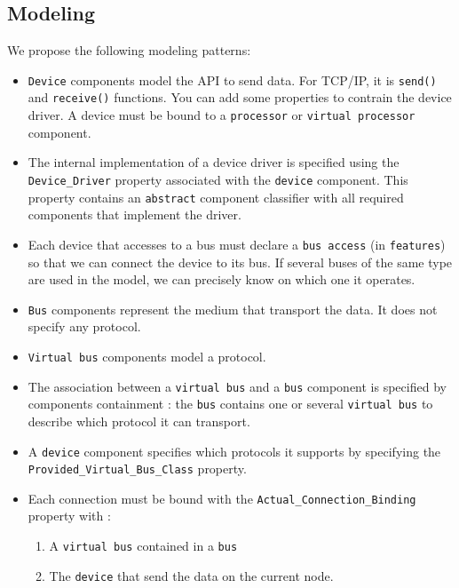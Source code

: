 \documentclass[11pt]{article}
\begin{document}
   \subsection{Modeling}
   We propose the following modeling patterns:
   \begin{itemize}
      \item
         \texttt{Device} components model the API to send data. For TCP/IP, it is
         \texttt{send()} and \texttt{receive()} functions. You can add some
         properties to contrain the device driver. A device must be bound to a
         \texttt{processor} or \texttt{virtual processor} component.
      \item
         The internal implementation of a device driver is specified using the
         \texttt{Device\_Driver} property associated with the \texttt{device}
         component. This property contains an \texttt{abstract} component
         classifier with all required components that implement the driver.
      \item
         Each device that accesses to a bus must declare a \texttt{bus
         access} (in \texttt{features}) so that we can connect the device to its bus. If several buses
         of the same type are used in the model, we can precisely know on which
         one it operates.
      \item
         \texttt{Bus} components represent the medium that transport the data. It does
         not specify any protocol.
      \item
         \texttt{Virtual bus} components model a protocol.
      \item
         The association between a \texttt{virtual bus} and a \texttt{bus}
         component is specified by components containment : the \texttt{bus}
         contains one or several \texttt{virtual bus} to describe which protocol
         it can transport.
      \item
         A \texttt{device} component specifies which protocols it supports by
         specifying the \texttt{Provided\_Virtual\_Bus\_Class} property.
      \item
         Each connection must be bound with the 
         \texttt{Actual\_Connection\_Binding} property with :
         \begin{enumerate}
            \item
               A \texttt{virtual bus} contained in a \texttt{bus}
            \item
               The \texttt{device} that send the data on the current node.
         \end{enumerate}
   \end{itemize}
\end{document}
